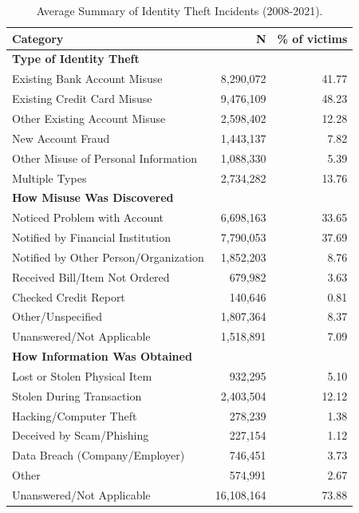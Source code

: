 \begin{table}[h!]
  \centering
  \caption{Average Summary of Identity Theft Incidents (2008-2021).}
  \label{tab:theft_summary_avg}
  \begin{tabular}{lrr}
    \toprule
    \textbf{Category} & \textbf{N} & \textbf{\% of victims} \\
    \midrule
    \multicolumn{3}{l}{\textbf{Type of Identity Theft\tnote{*}}} \\
    \quad Existing Bank Account Misuse & 8,290,072 & 41.77 \\
    \quad Existing Credit Card Misuse & 9,476,109 & 48.23 \\
    \quad Other Existing Account Misuse & 2,598,402 & 12.28 \\
    \quad New Account Fraud & 1,443,137 & 7.82 \\
    \quad Other Misuse of Personal Information & 1,088,330 & 5.39 \\
    \quad Multiple Types & 2,734,282 & 13.76 \\
    \midrule
    \multicolumn{3}{l}{\textbf{How Misuse Was Discovered\tnote{**}}} \\
    \quad Noticed Problem with Account & 6,698,163 & 33.65 \\
    \quad Notified by Financial Institution & 7,790,053 & 37.69 \\
    \quad Notified by Other Person/Organization & 1,852,203 & 8.76 \\
    \quad Received Bill/Item Not Ordered & 679,982 & 3.63 \\
    \quad Checked Credit Report & 140,646 & 0.81 \\
    \quad Other/Unspecified & 1,807,364 & 8.37 \\
    \quad Unanswered/Not Applicable & 1,518,891\tnote{***} & 7.09 \\
    \midrule
    \multicolumn{3}{l}{\textbf{How Information Was Obtained\tnote{**}}} \\
    \quad Lost or Stolen Physical Item & 932,295 & 5.10 \\
    \quad Stolen During Transaction & 2,403,504 & 12.12 \\
    \quad Hacking/Computer Theft & 278,239 & 1.38 \\
    \quad Deceived by Scam/Phishing & 227,154 & 1.12 \\
    \quad Data Breach (Company/Employer) & 746,451 & 3.73 \\
    \quad Other & 574,991 & 2.67 \\
    \quad Unanswered/Not Applicable & 16,108,164\tnote{***} & 73.88 \\

\end{tabular}
\end{table}
